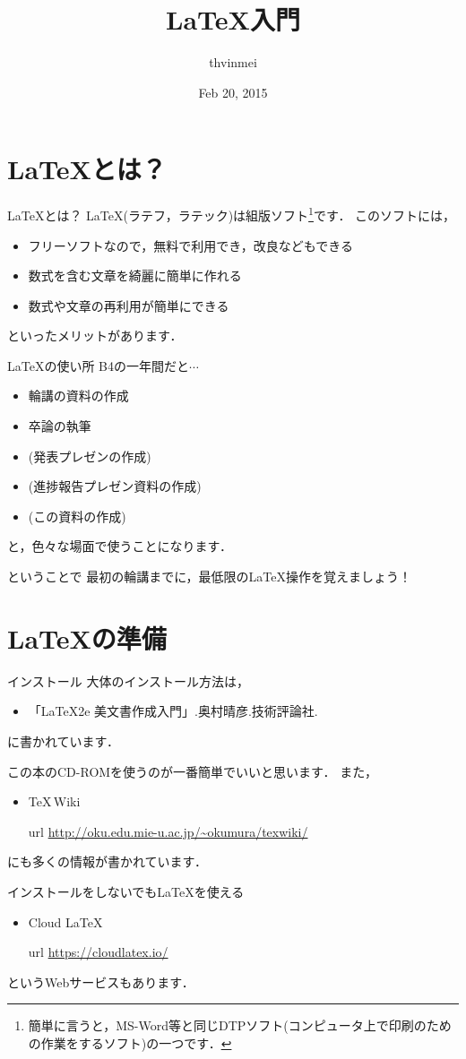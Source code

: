 \documentclass[slide,dvipdfmx]{beamer}
\title{\LaTeX 入門}
\author{thvinmei}
\date{Feb 20, 2015}
\begin{document}
\begin{frame}

\titlepage
\end{frame}

\section{\LaTeX とは？}
\begin{frame}{\LaTeX とは？}
\LaTeX (ラテフ，ラテック)は組版ソフト\footnote{簡単に言うと，MS-Word等と同じDTPソフト(コンピュータ上で印刷のための作業をするソフト)の一つです．}です．
このソフトには，
\begin{itemize}
\item フリーソフトなので，無料で利用でき，改良などもできる
\item 数式を含む文章を綺麗に簡単に作れる
\item 数式や文章の再利用が簡単にできる
\end{itemize}
といったメリットがあります．
\end{frame}

\begin{frame}{\LaTeX の使い所}
B4の一年間だと$\cdots$
\begin{itemize}
\item 輪講の資料の作成
\item 卒論の執筆
\item (発表プレゼンの作成)
\item (進捗報告プレゼン資料の作成)
\item (この資料の作成)
\end{itemize}
と，色々な場面で使うことになります．
\end{frame}


\begin{frame}{ということで}
最初の輪講までに，最低限の\LaTeX 操作を覚えましょう！
\end{frame}
\section{\LaTeX の準備}
\begin{frame}{インストール}
大体のインストール方法は，
\begin{itemize}
\item 「\LaTeX2e 美文書作成入門」.奥村晴彦.技術評論社.
\end{itemize}
に書かれています．

この本のCD-ROMを使うのが一番簡単でいいと思います．
また，
\begin{itemize}
\item \TeX \,Wiki
\item[url] \url{http://oku.edu.mie-u.ac.jp/~okumura/texwiki/}
\end{itemize}
にも多くの情報が書かれています．

インストールをしないでも\LaTeX を使える
\begin{itemize}
\item Cloud \LaTeX
\item[url] \url{https://cloudlatex.io/}
\end{itemize}
というWebサービスもあります．
\end{frame}
\end{document}
